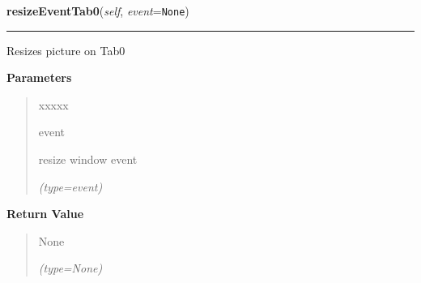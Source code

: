 \hspace{.8\funcindent}\begin{boxedminipage}{\funcwidth}

    \raggedright \textbf{resizeEventTab0}(\textit{self}, \textit{event}={\tt None})

    \vspace{-1.5ex}

    \rule{\textwidth}{0.5\fboxrule}
\setlength{\parskip}{2ex}
    Resizes picture on Tab0

\setlength{\parskip}{1ex}
      \textbf{Parameters}
      \vspace{-1ex}

      \begin{quote}
        \begin{Ventry}{xxxxx}

          \item[event]

          resize window event

            {\it (type=event)}

        \end{Ventry}

      \end{quote}

      \textbf{Return Value}
    \vspace{-1ex}

      \begin{quote}
      None

      {\it (type=None)}

      \end{quote}

    \end{boxedminipage}

    \label{client_gui:GuiClass:resizeEventTab1}

    \vspace{0.5ex}

